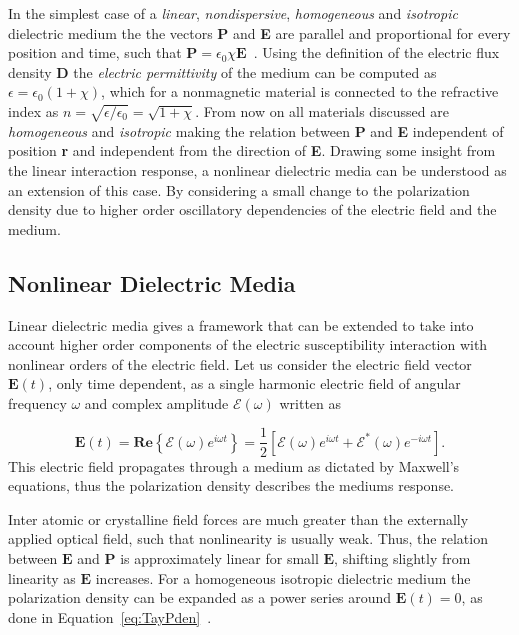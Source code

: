 In the simplest case of a \emph{linear}, \emph{nondispersive}, \emph{homogeneous} and \emph{isotropic} dielectric medium the the vectors \textbf{P} and \textbf{E} are parallel and proportional for every position and time, such that $\textbf{P}=\epsilon_0\chi\textbf{E}$~\cite{FundPhoto,FiberAgrawal}. Using the definition of the electric flux density \textbf{D} the \emph{electric permittivity} of the medium can be computed as $\epsilon=\epsilon_0(1+\chi)$, which for a nonmagnetic material is connected to the refractive index as $n=\sqrt{\epsilon/\epsilon_0}=\sqrt{1+\chi}$. From now on all materials discussed are \emph{homogeneous} and \emph{isotropic} making the relation between \textbf{P} and \textbf{E} independent of position \textbf{r} and independent from the direction of  \textbf{E}. Drawing some insight from the linear interaction response, a nonlinear dielectric media can be understood as an extension of this case. By considering a small change to the polarization density due to higher order oscillatory dependencies of the electric field and the medium. 


\subsection{ Nonlinear Dielectric Media}\label{sec:NLDM}

 Linear dielectric media gives a framework that can be extended to take into account higher order components of the electric susceptibility interaction with nonlinear orders of the electric field.  Let us consider the electric field vector $\textbf{E}(t)$, only time dependent, as a single harmonic electric field of angular frequency $\omega$ and complex amplitude $\mathcal{E}(\omega)$ written as~\cite{FundPhoto} 
 
\begin{equation}
\textbf{E}(t)= \textbf{Re}\left\{\mathcal{E}(\omega)e^{i\omega t}\right\}=\frac{1}{2}\left[\mathcal{E}(\omega)e^{i\omega t}+\mathcal{E}^*(\omega)e^{-i\omega t}\right].\label{eq:elfield}
\end{equation}
This electric field propagates through a medium as dictated by Maxwell's equations, thus the polarization density describes the mediums response. 

Inter atomic or crystalline field forces are much greater than the externally applied optical field, such that nonlinearity is usually weak. Thus, the relation between $\textbf{E}$ and $\textbf{P}$ is  approximately linear for small $\textbf{E}$, shifting slightly from linearity as $\textbf{E}$ increases. For a homogeneous isotropic dielectric medium the polarization density can be expanded as a power series around $\textbf{E}(t)=0$,  as done in Equation~\ref{eq:TayPden}~\cite{FundPhoto}.



